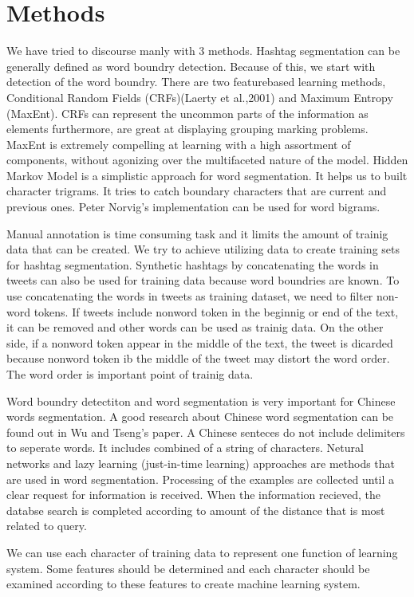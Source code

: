 \documentclass[12pt]{comjnl}
\begin{document}
\section{Methods}
We have tried to discourse manly with 3 methods. Hashtag segmentation can be generally defined as word boundry detection. Because of this, we
start with detection of the word boundry. There are two feature­based learning methods,
Conditional Random Fields (CRFs)(Laerty et al.,2001) and Maximum Entropy (MaxEnt).
CRFs can represent the uncommon parts of the information as elements furthermore, are great at
displaying grouping marking problems. MaxEnt is extremely compelling at learning with a high
assortment of components, without agonizing over the multifaceted nature of the model. Hidden
Markov Model is a simplistic approach for word segmentation. It helps us to built character
trigrams. It tries to catch boundary characters that are current and previous ones. Peter Norvig's
implementation can be used for word bigrams.

Manual annotation is time consuming task and it limits the amount of trainig data that can be
created. We try to achieve utilizing data to create training sets for hashtag segmentation. Synthetic
hashtags by concatenating the words in tweets can also be used for training data because word
boundries are known. To use concatenating the words in tweets as training dataset, we need to filter
non­word tokens. If tweets include non­word token in the beginnig or end of the text, it can be
removed and other words can be used as trainig data. On the other side, if a non­word token appear
in the middle of the text, the tweet is dicarded because non­word token ib the middle of the tweet
may distort the word order. The word order is important point of trainig data.

Word boundry detectiton and word segmentation is very important for Chinese words segmentation. A good research about Chinese word segmentation can be found out in Wu and Tseng's paper. A Chinese senteces do not
include delimiters to seperate words. It includes combined of a string of characters. Netural
networks and lazy learning (just-in-time learning) approaches are methods that are used in word segmentation.
Processing of the examples are collected until a clear request for information is received. When the information recieved, the databse search is completed according to amount of the distance that is most related to query.

We can use each character of training data to represent one function of learning system. Some
features should be determined and each character should be examined according to these features
to create machine learning system.
\end{document}
